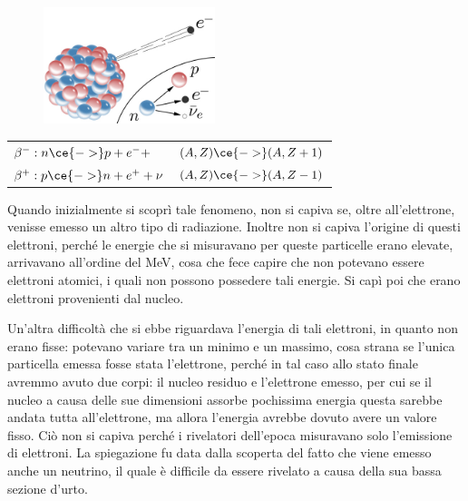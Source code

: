 \begin{minipage}{0.395\textwidth}
    \begin{figure}[H]
        \centering
        \includegraphics[width=5cm]{immagini/decadimento_beta.png}
    \end{figure}
\end{minipage}
\begin{minipage}{0.6\textwidth}
    \begin{center}
        \begin{tabular}{ll}
            $\beta^-: n \ce{->} p + e^- + $ & $(A,Z) \ce{ -> } (A,Z +1)$\\
            $\beta^+: p \ce{->} n + e^+ + \nu$ & $(A,Z) \ce{-> } (A,Z -1)$
        \end{tabular}
    \end{center}
\end{minipage}

\vspace{0.4cm}

Quando inizialmente si scoprì tale fenomeno, non si capiva se, oltre all'elettrone, venisse emesso un altro tipo di radiazione. Inoltre non si capiva l'origine di questi elettroni, perché le energie che si misuravano per queste particelle erano elevate, arrivavano all'ordine del MeV, cosa che fece capire che non potevano essere elettroni atomici, i quali non possono possedere tali energie. Si capì poi che erano elettroni provenienti dal nucleo.

Un'altra difficoltà che si ebbe riguardava l'energia di tali elettroni, in quanto non erano fisse: potevano variare tra un minimo e un massimo, cosa strana se l'unica particella emessa fosse stata l'elettrone, perché in tal caso allo stato finale avremmo avuto due corpi: il nucleo residuo e l'elettrone emesso, per cui se il nucleo a causa delle sue dimensioni assorbe pochissima energia questa sarebbe andata tutta all'elettrone, ma allora l'energia avrebbe dovuto avere un valore fisso. Ciò non si capiva perché i rivelatori dell'epoca misuravano solo l'emissione di elettroni. La spiegazione fu data dalla scoperta del fatto che viene emesso anche un neutrino, il quale è difficile da essere rivelato a causa della sua bassa sezione d'urto.

